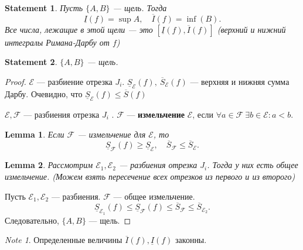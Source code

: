 \documentclass[11pt]{book}
\renewcommand{\le}{\leqslant}
\renewcommand{\ge}{\geqslant}
\theoremstyle{definition}
\theoremstyle{plain}
\theoremstyle{plain}
\newtheorem*{lm}{Lemma}
\newtheorem*{st}{Statement}
\theoremstyle{definition}
\theoremstyle{remark}
\newtheorem*{note}{Note}
\begin{document}
\begin{st}
    Пусть $ \{A, B\}$ --- щель. Тогда
    \[
	\underline{I}(f) = \sup{ A} , \quad \overline{I}(f) = \inf(B)
    .\]
    Все числа, лежащие в этой щели --- это $ [ \underline{I} (f) , \overline{I}(f)]$ (верхний и нижний интегралы Римана-Дарбу от $ f$)
\end{st}
\begin{st}
    $\{A, B\}$ --- щель.
\end{st}
\begin{proof}
    $ \mathcal E $ --- разбиение отрезка $ J_i$.
    $ \underline{S}_{ \mathcal{E} } (f) , ~ \overline{S} _{ \mathcal{E} }(f)$ --- верхняя и нижняя сумма Дарбу.
    Очевидно, что $ \underline{S} _ \mathcal{E}  (f) \le  \overline{S} (f)$
    \begin{defn}
	$ \mathcal{E} , \mathcal{F}$ --- разбиения отрезка  $ J_i$ . $ \mathcal{F}$ --- {\bf измельчение} $ \mathcal{E} $, если $ \forall  a \in  \mathcal{F} ~ \exists  b \in  \mathcal{E} : a<b$.
    \end{defn}
    \begin{lm}
	Если $ \mathcal{F}$ --- измельчение для $ \mathcal{E} $, то \[
	    \underline{S} _\mathcal{F} (f) \ge \underline{S}_ \mathcal{E} , \quad \overline{S}_\mathcal{F} \le \overline{S}_ \mathcal{E}
	.\]
    \end{lm}
    \begin{lm}
	Рассмотрим  $ \mathcal{E}_1, \mathcal{E}_2$ --- разбиения отрезка $ J_i$.
	Тогда у них есть общее измельчение. (Можем взять пересечение всех отрезков из первого и из второго)
    \end{lm}
    Пусть $ \mathcal{E}_1, \mathcal{E}_2$ --- разбиения. $ \mathcal{F}$ --- общее измельчение.
    \[
	\underline{S}_{\mathcal{E}_1} (f) \le  \underline{S}_{\mathcal{F}} (f) \le \overline{S}_\mathcal{F} \le \overline{S}_{\mathcal{E}_2}
    .\]
    Следовательно, $ \{A, B\}$ --- щель.
\end{proof}
\begin{note}
    Определенные величины $ \overline{I}(f) , \underline{I}(f)$ законны.
\end{note}
\end{document}
